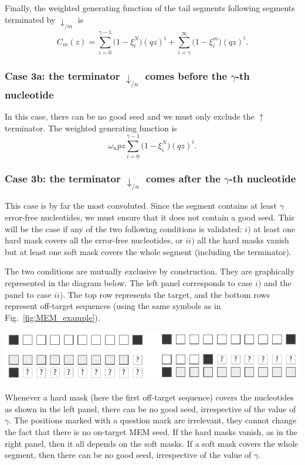\documentclass{article}
\newenvironment{inset}
{\vspace{0.5\baselineskip}\begin{center}}
{\end{center}\vspace{0.5\baselineskip}}
\begin{document}
Finally, the weighted generating function of the tail segments following
segments terminated by $\downarrow_{/m}$ is
\begin{equation}
\label{eq:C}
C_m(z) =
\sum_{i=0}^{\gamma-1} \Big(1 - \xi_i^N \Big) (qz)^i +
  \sum_{i=\gamma}^\infty \Big(1 - \xi_i^m \Big) (qz)^i.
\end{equation}

\subsubsection*{Case 3a: the terminator $\downarrow_{/n}$ comes before the
$\gamma$-th nucleotide}

In this case, there can be no good seed and we must only exclude the
$\uparrow$ terminator. The weighted generating function is
\begin{equation}
\omega_n pz \sum_{i=0}^{\gamma-1} \Big(1 - \xi_i^N \Big) (qz)^i.
\end{equation}

\subsubsection*{Case 3b: the terminator $\downarrow_{/n}$ comes after the
$\gamma$-th nucleotide}

This case is by far the most convoluted. Since the segment contains at
least $\gamma$ error-free nucleotides, we must ensure that it does not
contain a good seed. This will be the case if any of the two following
conditions is validated: $i)$ at least one hard mask covers all the
error-free nucleotides, or $ii)$ all the hard masks vanish but at least
one soft mask covers the whole segment (including the terminator).

The two conditions are mutually exclusive by construction. They are
graphically represented in the diagram below. The left panel corresponds
to case $i)$ and the panel to case $ii)$. The top row represents the
target, and the bottom rows represent off-target sequences (using the same
symbols as in Fig.~\ref{fig:MEM_example}).
\begin{inset}
\includegraphics{masks.pdf}
\end{inset}

Whenever a hard mask (here the first off-target sequence) covers the
nucleotides as shown in the left panel, there can be no good seed,
irrespective of the value of $\gamma$. The positions marked with a
question mark are irrelevant, they cannot change the fact that there is no
on-target MEM seed. If the hard masks vanish, as in the right panel, then
it all depends on the soft masks. If a soft mask covers the whole segment,
then there can be no good seed, irrespective of the value of $\gamma$.
\end{document}
